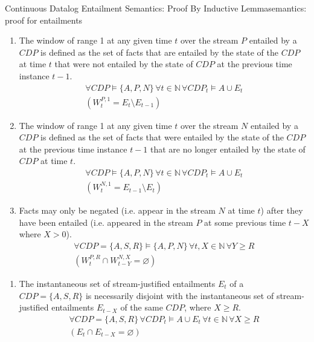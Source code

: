 \begin{nestedsection}{Continuous Datalog Entailment Semantics: Proof By Inductive Lemma}{semantics: proof for entailments}
	\begin{enumerate}\setcounter{enumi}{\thecontinuousDatalogAxioms}
		\item\label{axiom:continuous datalog: positive window increment}
			The window of range 1 at any given time $t$ over the stream $P$ entailed by a ${CDP}$ is defined as the set of facts that are entailed by the state of the ${CDP}$ at time $t$ that were not entailed by the state of ${CDP}$ at the previous time instance ${t-1}$.
			\begin{multline*}
				\forall CDP \vDash \{A,P,N\} \, \forall t \in \mathbb{N} \, \forall CDP_t \vDash A \cup E_t \\
					\left( W^{P,1}_{t} = E_{t} \setminus E_{t-1} \right)
			\end{multline*}
		\item\label{axiom:continuous datalog: negative window increment}
			The window of range 1 at any given time $t$ over the stream $N$ entailed by a ${CDP}$ is defined as the set of facts that were entailed by the state of the ${CDP}$ at the previous time instance ${t-1}$ that are no longer entailed by the state of ${CDP}$ at time $t$.
			\begin{multline*}
				\forall CDP \vDash \{A,P,N\} \, \forall t \in \mathbb{N} \, \forall CDP_t \vDash A \cup E_t \\
					\left( W^{N,1}_{t} = E_{t-1} \setminus E_{t} \right)
			\end{multline*}
		\item\label{axiom:continuous datalog: entailment precedes negation}
			Facts may only be negated (i.e. appear in the stream $N$ at time $t$) after they have been entailed (i.e. appeared in the stream $P$ at some previous time ${t-X}$ where ${X > 0}$).
			\begin{multline*}
				\forall CDP = \{A,S,R\} \vDash \{A,P,N\} \, \forall t,X \in \mathbb{N} \, \forall Y \geq R \\
					\left( W^{P,R}_{t} \cap W^{N,X}_{t-Y} = \varnothing \right)
			\end{multline*}
		\setcounter{continuousDatalogAxioms}{\theenumi}
	\end{enumerate}

	\begin{enumerate}\setcounter{enumi}{\thecontinuousDatalogAxioms}
		\item\label{axiom:continuous datalog: disjoint entailments}
			The instantaneous set of stream-justified entailments $E_t$ of a ${CDP = \{A,S,R\}}$ is necessarily disjoint with the instantaneous set of stream-justified entailments $E_{t-X}$ of the same ${CDP}$, where ${X \geq R}$.
			\begin{multline*}
				\forall CDP = \{A,S,R\} \, \forall CDP_t \vDash A \cup E_t \, \forall t \in \mathbb{N} \, \forall X \geq R \\
					\left( E_t \cap E_{t-X} = \varnothing \right)
			\end{multline*}
		\setcounter{continuousDatalogAxioms}{\theenumi}
	\end{enumerate}	


\end{nestedsection}
